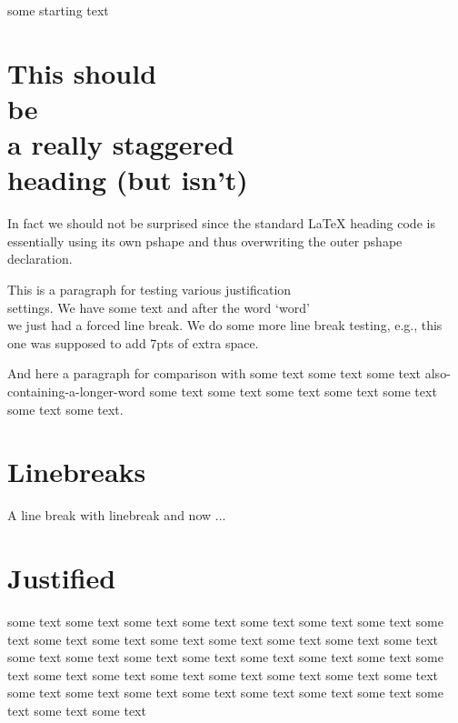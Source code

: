 \documentclass{article}
\def\trace{\tracingassigns=1\tracingall}
\begin{document}
some starting text

{}

\section{This should\\ be\\ 
         a really staggered\\heading (but isn't)}

In fact we should not be surprised since the standard \LaTeX{} heading
code is essentially using its own pshape and thus overwriting the
outer pshape declaration.

This is a paragraph for testing various justification\\ settings. We have some
text and after the word `word' \\ we just had a forced line break. We
do some more line break testing, e.g., this\\[7pt] one was supposed to
add 7pts of extra space.


And here a paragraph for comparison with some text some text some text
also-containing-a-longer-word some text some text some text some text
some text some text some text.

\section{Linebreaks}


A line break with linebreak\linebreak
and now ...



\section{Justified}

some text
some text some text some text some text some text some text some text
some text some text some text some text some text some text
some text some text some text some text some text some text some text
some text some text some text some text some text some text
some text some text some text some text some text some text some text
some text some text some text some text some text some text
\end{document}
